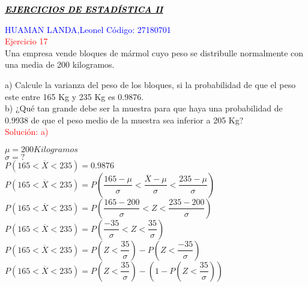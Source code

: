 \documentclass[DIV=calc,paper=a4,fontsize=11pt,openany]{book}
\begin{document}
 
\thispagestyle{empty}

\newpage




\begin{center}
\large{\textcolor{black}{\textbf{\underline{\textit{EJERCICIOS DE ESTADÍSTICA II}}}}}
\end{center}

\textcolor{blue}{HUAMAN LANDA,Leonel Código: 27180701}\\

\textcolor{red}{Ejercicio 17}\\

Una empresa vende bloques de mármol cuyo peso se distribulle normalmente con una media de 200 kilogramos.

a) Calcule la varianza del peso de los bloques, si la probabilidad de que el peso este entre 165 Kg y 235 Kg es 0.9876.\\

b) ¿Qué tan grande debe ser la muestra para que haya una probabilidad de 0.9938 de que el peso medio de la muestra sea inferior a 205 Kg?\\

\textcolor{red}{Solución: a)}

$\mu = 200 Kilogramos$\\
$\sigma = ?$\\
$\textit{P}(165 < \overline{X} < 235) = 0.9876$\\

$\textit{P}(165 < \overline{X} < 235) = \textit{P}(\dfrac{165 - \mu}{\sigma} < \dfrac{\overline{X} - \mu}{\sigma} < \dfrac{235 - \mu}{\sigma})$\\

$\textit{P}(165 < \overline{X} < 235) = \textit{P}(\dfrac{165 - 200}{\sigma} < \textit{Z} < \dfrac{235 - 200}{\sigma})$\\

$\textit{P}(165 < \overline{X} < 235) = \textit{P}(\dfrac{-35}{\sigma} < \textit{Z} < \dfrac{35}{\sigma})$\\

$\textit{P}(165 < \overline{X} < 235) = \textit{P}(\textit{Z} < \dfrac{35}{\sigma}) - \textit{P}(\textit{Z} < \dfrac{-35}{\sigma})$\\

$\textit{P}(165 < \overline{X} < 235) = \textit{P}(\textit{Z} < \dfrac{35}{\sigma}) - (1 -\textit{P}(\textit{Z} < \dfrac{35}{\sigma}))$\\
\end{document}
